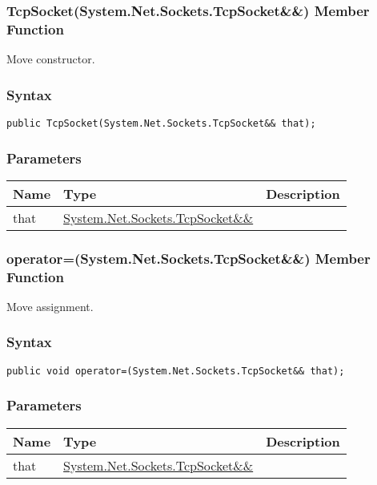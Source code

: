 \documentclass[a4paper,oneside,11.000000pt]{book}
\begin{document}
\hypertarget{System.Net.Sockets.TcpSocket.constructor.P.System.Net.Sockets.TcpSocket.RR.System.Net.Sockets.TcpSocket}{\subsubsection*{TcpSocket(System.Net.Sockets.TcpSocket\&\&) Member Function}}\begin{flushleft}
Move constructor.

\end{flushleft}
\subsubsection*{Syntax}
\texttt{public TcpSocket(System.Net.Sockets.TcpSocket\&\& that);}
\subsubsection*{Parameters}
\begin{flushleft}
\begin{supertabular}[l]{!{\raggedright}p{1.30721cm}!{\raggedright}p{8.55945cm}!{\raggedright}p{2.65538cm}}
\textbf{Name}
& \textbf{Type}
& \textbf{Description}
\\
\hline
that
& \hyperlink{System.Net.Sockets.TcpSocket}{System.\-Net.\-Sockets.\-TcpSocket\&\-\&\-}
& 
\\
\end{supertabular}

\end{flushleft}
\clearpage

\hypertarget{System.Net.Sockets.TcpSocket.operator.assign.P.System.Net.Sockets.TcpSocket.RR.System.Net.Sockets.TcpSocket}{\subsubsection*{operator=(System.Net.Sockets.TcpSocket\&\&) Member Function}}\begin{flushleft}
Move assignment.

\end{flushleft}
\subsubsection*{Syntax}
\texttt{public void operator=(System.Net.Sockets.TcpSocket\&\& that);}
\subsubsection*{Parameters}
\begin{flushleft}
\begin{supertabular}[l]{!{\raggedright}p{1.30721cm}!{\raggedright}p{8.55945cm}!{\raggedright}p{2.65538cm}}
\textbf{Name}
& \textbf{Type}
& \textbf{Description}
\\
\hline
that
& \hyperlink{System.Net.Sockets.TcpSocket}{System.\-Net.\-Sockets.\-TcpSocket\&\-\&\-}
& 
\\
\end{supertabular}

\end{flushleft}
\clearpage
\end{document}
